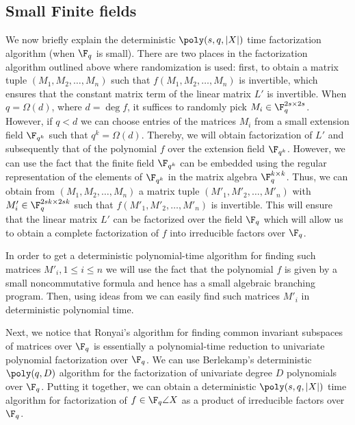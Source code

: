 \subsection{Small Finite fields}\label{small-field}

We now briefly explain the deterministic $\poly(s,q,|X|)$ time
factorization algorithm (when $\F_q$ is small). There are two places
in the factorization algorithm outlined above where randomization is
used: first, to obtain a matrix tuple $(M_1,M_2,\ldots,M_n)$ such that
$f(M_1,M_2,\ldots,M_n)$ is invertible, which ensures that the constant
matrix term of the linear matrix $L'$ is invertible. When
$q=\Omega(d)$, where $d= \deg f$, it suffices to randomly pick
$M_i\in\F_q^{2s\times 2s}$. However, if $q<d$ we can choose entries of
the matrices $M_i$ from a small extension field $\F_{q^k}$ such that
$q^k=\Omega(d)$.  Thereby, we will obtain factorization of $L'$ and
subsequently that of the polynomial $f$ over the extension field
$\F_{q^k}$. However, we can use the fact that the finite field
$\F_{q^k}$ can be embedded using the regular representation of the
elements of $\F_{q^k}$ in the matrix algebra $\F_q^{k\times k}$. Thus,
we can obtain from $(M_1,M_2,\ldots,M_n)$ a matrix tuple
$(M'_1,M'_2,\ldots,M'_n)$ with $M'_i\in\F_q^{2sk\times 2sk}$ such that
$f(M'_1,M'_2,\ldots,M'_n)$ is invertible. This will ensure that the
linear matrix $L'$ can be factorized over the field $\F_q$ which will
allow us to obtain a complete factorization of $f$ into irreducible
factors over $\F_q$.

In order to get a deterministic polynomial-time algorithm for finding
such matrices $M'_i, 1\le i\le n$ we will use the fact that the
polynomial $f$ is given by a small noncommutative formula and hence
has a small algebraic branching program. Then, using ideas from
\cite{RS05,F14,ACDM20} we can easily find such matrices $M'_i$ in
deterministic polynomial time.

Next, we notice that Ronyai's algorithm for finding common invariant
subspaces of matrices over $\F_q$ is essentially a polynomial-time
reduction to univariate polynomial factorization over $\F_q$. We can
use Berlekamp's deterministic $\poly(q,D)$ algorithm for the
factorization of univariate degree $D$ polynomials over
$\F_q$. Putting it together, we can obtain a deterministic
$\poly(s,q,|X|)$ time algorithm for factorization of
$f\in\F_q\angle{X}$ as a product of irreducible factors over
$\F_q$.\smallskip


